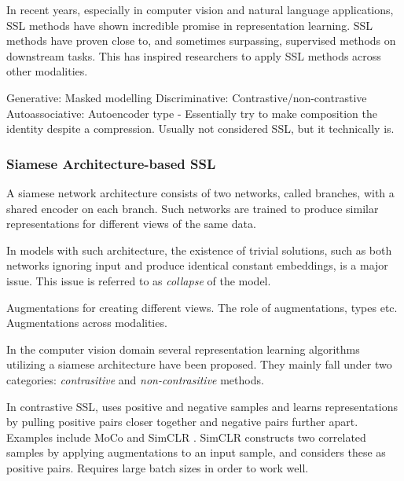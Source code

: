 \documentclass[../../thesis.tex]{subfiles}
\begin{document}
In recent years, especially in computer vision and natural language applications, SSL methods have shown incredible promise in representation learning. SSL methods have proven close to, and sometimes surpassing, supervised methods on downstream tasks. This has inspired researchers to apply SSL methods across other modalities. 


Generative: Masked modelling 
Discriminative: Contrastive/non-contrastive
Autoassociative: Autoencoder type - Essentially try to make composition the identity despite a compression. Usually not considered SSL, but it technically is. 

\subsubsection{Siamese Architecture-based SSL }
\cite{lee2024computer}
A siamese network architecture \cite{siamese} consists of two networks, called branches, with a shared encoder on each branch. Such networks are trained to produce similar representations for different views of the same data. \newline

In models with such architecture, the existence of trivial solutions, such as both networks ignoring input and produce identical constant embeddings, is a major issue. This issue is referred to as \textit{collapse} of the model.\newline

Augmentations for creating different views. The role of augmentations, types etc. Augmentations across modalities. \newline


In the computer vision domain several representation learning algorithms utilizing a siamese architecture have been proposed. They mainly fall under two categories: \textit{contrasitive} and \textit{non-contrasitive} methods.\newline

In contrastive SSL, uses positive and negative samples and learns representations by pulling positive pairs closer together and negative pairs further apart. Examples include MoCo \cite{he2020momentum} and SimCLR \cite{chen2020simple}. SimCLR constructs two correlated samples by applying augmentations to an input sample, and considers these as positive pairs. Requires large batch sizes in order to work well.
\end{document}
